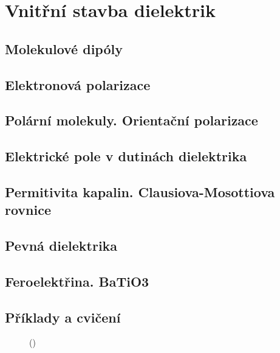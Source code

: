 \setchaptertoc
\chapter{Vnitřní stavba dielektrik}\label{fyz:IIchapXI}

  \section{Molekulové dipóly}\label{fyz:IIchapXIsecI}
  \section{Elektronová polarizace}\label{fyz:IIchapXIsecII}
  \section{Polární molekuly. Orientační polarizace}\label{fyz:IIchapXIsecIII}
  \section{Elektrické pole v dutinách dielektrika}\label{fyz:IIchapXIsecIV}
  \section{Permitivita kapalin. Clausiova-Mosottiova rovnice}\label{fyz:IIchapXIsecV}
  \section{Pevná dielektrika}\label{fyz:IIchapXIsecVI}
  \section{Feroelektřina. BaTiO3}\label{fyz:IIchapXIsecVII}
  \section{Příklady a cvičení}\label{fyz:IIchapXIsecVIII}

    \begin{figure}[ht!]
      \centering
                     \newline
      \label{fyz:fig714}
      \caption{
               (\cite[s.~748]{Feynman02})}
    \end{figure}

